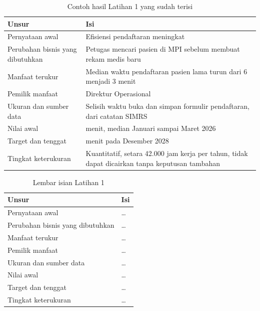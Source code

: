 \begin{table}[!htb]
  \centering
  \caption{Contoh hasil Latihan 1 yang sudah terisi}
  \label{tab:ch13-lat1-contoh}
  \footnotesize
  \begin{tabularx}{\textwidth}{>{\raggedright\arraybackslash}p{3.2cm}
                               >{\raggedright\arraybackslash}X}
    \hline
    \textbf{Unsur} & \textbf{Isi} \\
    \hline
    Pernyataan awal & Efisiensi pendaftaran meningkat \\
    \hline
    Perubahan bisnis yang dibutuhkan & Petugas mencari pasien di MPI sebelum
      membuat rekam medis baru \\
    \hline
    Manfaat terukur & Median waktu pendaftaran pasien lama turun dari 6
      menjadi 3 menit \\
    \hline
    Pemilik manfaat & Direktur Operasional \\
    \hline
    Ukuran dan sumber data & Selisih waktu buka dan simpan formulir
      pendaftaran, dari catatan SIMRS \\
    \hline
    Nilai awal & 6 menit, median Januari sampai Maret 2026 \\
    \hline
    Target dan tenggat & 3 menit pada Desember 2028 \\
    \hline
    Tingkat keterukuran & Kuantitatif, setara 42.000 jam kerja per tahun,
      tidak dapat dicairkan tanpa keputusan tambahan \\
    \hline
  \end{tabularx}
\end{table}

\begin{table}[!htb]
  \centering
  \caption{Lembar isian Latihan 1}
  \label{tab:ch13-lat1-hasil}
  \footnotesize
  \begin{tabularx}{\textwidth}{>{\raggedright\arraybackslash}p{3.2cm}
                               >{\raggedright\arraybackslash}X}
    \hline
    \textbf{Unsur} & \textbf{Isi} \\
    \hline
    Pernyataan awal & \dots \\
    \hline
    Perubahan bisnis yang dibutuhkan & \dots \\
    \hline
    Manfaat terukur & \dots \\
    \hline
    Pemilik manfaat & \dots \\
    \hline
    Ukuran dan sumber data & \dots \\
    \hline
    Nilai awal & \dots \\
    \hline
    Target dan tenggat & \dots \\
    \hline
    Tingkat keterukuran & \dots \\
    \hline
  \end{tabularx}
\end{table}

